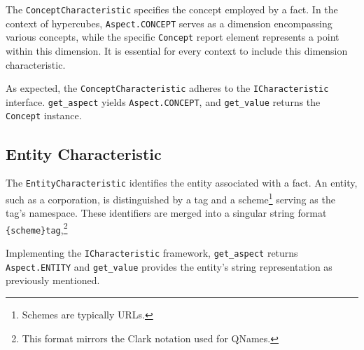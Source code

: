 The \texttt{ConceptCharacteristic} specifies the concept employed by a fact.
In the context of hypercubes, \texttt{Aspect.CONCEPT} serves as a dimension encompassing various concepts,
while the specific \texttt{Concept} report element represents a point within this dimension.
It is essential for every context to include this dimension characteristic.

As expected, the \texttt{ConceptCharacteristic} adheres to the \texttt{ICharacteristic} interface.
\texttt{get\_aspect} yields \texttt{Aspect.CONCEPT}, and \texttt{get\_value} returns the \texttt{Concept} instance.



\subsection{Entity Characteristic}

The \texttt{EntityCharacteristic} identifies the entity associated with a fact.
An entity, such as a corporation, is distinguished by a tag and a scheme\footnote{Schemes are typically URLs.} serving as the tag's namespace.
These identifiers are merged into a singular string format \texttt{\{scheme\}tag},\footnote{This format mirrors the Clark notation used for QNames.\cite{w3_qnames}}

Implementing the \texttt{ICharacteristic} framework,
\texttt{get\_aspect} returns \texttt{Aspect.ENTITY} and \texttt{get\_value} provides the entity's string representation as previously mentioned.

